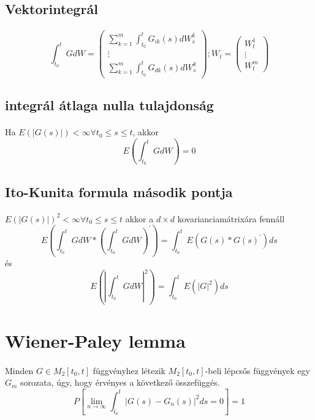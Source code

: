 \documentclass[11pt,a4paper]{article}
\begin{document}
				\subsection{Vektorintegrál}
					\paragraph{}
						$$\int_{t_0}^t G dW = \left(\begin{array}{c}
							\sum_{k=1}^m \int_{t_0}^t G_{ik}(s)dW_s^k \\
							\vdots \\
							\sum_{k=1}^m \int_{t_0}^t G_{dk}(s)dW_s^k
						\end{array} \right);
						W_t = \left(\begin{array}{c}
							W_t^1 \\
							\vdots \\
							W_t^m
						\end{array}\right)$$
				\subsection{integrál átlaga nulla tulajdonság}
					\paragraph{}
						Ha $E(|G(s)|) < \infty \forall t_0 \le s \le t$, akkor
						$$E\left( \int_{t_0}^t G dW \right)=0$$
				\subsection{Ito-Kunita formula második pontja}
					\paragraph{}
						$E(|G(s)|)^2 < \infty \forall t_0 \le s \le t$ akkor a $d \times d$ kovarianciamátrixára fennáll
						$$E\left( \int_{t_0}^t G dW * \left( \int_{t_0}^t G dW \right)^\prime \right) = \int_{t_0}^t E(G(s)*G(s)^\prime)ds$$
						és
						$$E\left( \left| \int_{t_0}^t G dW \right|^2 \right) = \int_{t_0}^t E(|G|^2)ds$$
			\section{Wiener-Paley lemma}
				\paragraph{}
					Minden $G \in M_2[t_0, t]$ függvényhez létezik $M_2[t_0,t]$-beli lépcsős függvények egy $G_m$ sorozata, úgy, hogy érvényes a következő összefüggés.
					$$P\left[ \lim_{n \to \infty} {\int_{t_0}^t {|G(s) - G_n(s)|^2}ds } = 0\right] = 1$$
\end{document}
